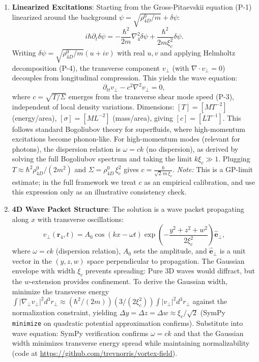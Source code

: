 \begin{enumerate}
\item \textbf{Linearized Excitations}: Starting from the Gross-Pitaevskii equation (P-1) linearized around the background $\psi = \sqrt{\rho_{4D}^0/m} + \delta\psi$:
   \[
   i\hbar \partial_t \delta\psi = -\frac{\hbar^2}{2 m} \nabla_4^2 \delta\psi + \frac{\hbar^2}{2 m \xi_c^2} \delta\psi.
   \]
   Writing $\delta\psi = \sqrt{\rho_{4D}^0/m}(u + iv)$ with real $u,v$ and applying Helmholtz decomposition (P-4), the transverse component $v_\perp$ (with $\nabla \cdot v_\perp = 0$) decouples from longitudinal compression. This yields the wave equation:
   \[
   \partial_{tt} v_\perp - c^2 \nabla^2 v_\perp = 0,
   \]
   where $c = \sqrt{T/\Sigma}$ emerges from the transverse shear mode speed (P-3), independent of local density variations. Dimensions: $[T] = [M T^{-2}]$ (energy/area), $[\sigma] = [M L^{-2}]$ (mass/area), giving $[c] = [L T^{-1}]$. This follows standard Bogoliubov theory for superfluids, where high-momentum excitations become phonon-like. For high-momentum modes (relevant for photons), the dispersion relation is $\omega = ck$ (no dispersion), as derived by solving the full Bogoliubov spectrum and taking the limit $k\xi_c \gg 1$.
Plugging $T \approx \hbar^2 \rho_{4D}^0/(2 m^2)$ and $\Sigma =\rho_{4D}^0\,\xi_c^2$ gives $\displaystyle c = \frac{\hbar}{\sqrt{2}\,m\,\xi_c}$.
\emph{Note:} This is a GP-limit estimate; in the full framework we treat $c$ as an empirical calibration, and use this expression only as an illustrative consistency check.


\item \textbf{4D Wave Packet Structure}: The solution is a wave packet propagating along $x$ with transverse oscillations:
   \[
   v_\perp(\mathbf{r}_4, t) = A_0 \cos(kx - \omega t) \exp\left(-\frac{y^2 + z^2 + w^2}{2\xi_c^2}\right) \hat{\mathbf{e}}_\perp,
   \]
   where $\omega = ck$ (dispersion relation), $A_0$ sets the amplitude, and $\hat{\mathbf{e}}_\perp$ is a unit vector in the $(y,z,w)$ space perpendicular to propagation. The Gaussian envelope with width $\xi_c$ prevents spreading: Pure 3D waves would diffract, but the $w$-extension provides confinement. To derive the Gaussian width, minimize the transverse energy $\int |\nabla_\perp v_\perp|^2 d^3 r_\perp \approx (\hbar^2 / (2 m)) (3 / (2 \xi_c^2)) \int |v_\perp|^2 d^3 r_\perp$ against the normalization constraint, yielding $\Delta y = \Delta z = \Delta w \approx \xi_c / \sqrt{2}$ (SymPy \texttt{minimize} on quadratic potential approximation confirms). Substitute into wave equation: SymPy verification confirms $\omega = ck$ and that the Gaussian width minimizes transverse energy spread while maintaining normalizability (code at \url{https://github.com/trevnorris/vortex-field}).


\end{enumerate}
